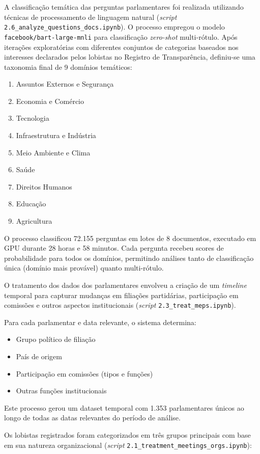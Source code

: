 A classificação temática das perguntas parlamentares foi realizada utilizando técnicas de processamento de linguagem natural (\textit{script} \texttt{2.6\_analyze\_questions\_docs.ipynb}). O processo empregou o modelo \texttt{facebook/bart-large-mnli} para classificação \textit{zero-shot} multi-rótulo. Após iterações exploratórias com diferentes conjuntos de categorias baseados nos interesses declarados pelos lobistas no Registro de Transparência, definiu-se uma taxonomia final de 9 domínios temáticos:
\begin{enumerate}
    \item Assuntos Externos e Segurança
    \item Economia e Comércio  
    \item Tecnologia
    \item Infraestrutura e Indústria
    \item Meio Ambiente e Clima
    \item Saúde
    \item Direitos Humanos
    \item Educação
    \item Agricultura
\end{enumerate}

O processo classificou 72.155 perguntas em lotes de 8 documentos, executado em GPU durante 28 horas e 58 minutos. Cada pergunta recebeu scores de probabilidade para todos os domínios, permitindo análises tanto de classificação única (domínio mais provável) quanto multi-rótulo.

O tratamento dos dados dos parlamentares envolveu a criação de um \textit{timeline} temporal para capturar mudanças em filiações partidárias, participação em comissões e outros aspectos institucionais (\textit{script} \texttt{2.3\_treat\_meps.ipynb}).

Para cada parlamentar e data relevante, o sistema determina:
\begin{itemize}
    \item Grupo político de filiação
    \item País de origem
    \item Participação em comissões (tipos e funções)
    \item Outras funções institucionais
\end{itemize}

Este processo gerou um dataset temporal com 1.353 parlamentares únicos ao longo de todas as datas relevantes do período de análise.

Os lobistas registrados foram categorizados em três grupos principais com base em sua natureza organizacional (\textit{script} \texttt{2.1\_treatment\_meetings\_orgs.ipynb}):

